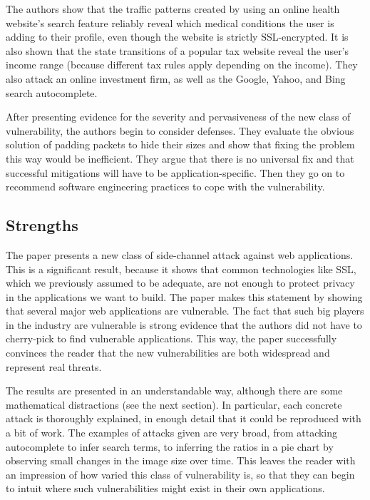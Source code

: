 \documentclass{acm_proc_article-sp}
\begin{document}
The authors show that the traffic patterns created by using an online health
website's search feature reliably reveal which medical conditions the user is
adding to their profile, even though the website is strictly SSL-encrypted. It
is also shown that the state transitions of a popular tax website reveal the
user's income range (because different tax rules apply depending on the income).
They also attack an online investment firm, as well as the Google, Yahoo, and
Bing search autocomplete.

After presenting evidence for the severity and pervasiveness of the new class of
vulnerability, the authors begin to consider defenses. They evaluate the obvious
solution of padding packets to hide their sizes and show that fixing the problem
this way would be inefficient. They argue that there is no universal fix and
that successful mitigations will have to be application-specific. Then they go
on to recommend software engineering practices to cope with the vulnerability.

\subsection{Strengths}

The paper presents a new class of side-channel attack against web applications.
This is a significant result, because it shows that common technologies like
SSL, which we previously assumed to be adequate, are not enough to protect
privacy in the applications we want to build. The paper makes this statement by
showing that several major web applications are vulnerable. The fact that such
big players in the industry are vulnerable is strong evidence that the authors
did not have to cherry-pick to find vulnerable applications. This way, the paper
successfully convinces the reader that the new vulnerabilities are both
widespread and represent real threats.

The results are presented in an understandable way, although there are some
mathematical distractions (see the next section). In particular, each concrete
attack is thoroughly explained, in enough detail that it could be reproduced
with a bit of work. The examples of attacks given are very broad, from attacking
autocomplete to infer search terms, to inferring the ratios in a pie chart by
observing small changes in the image size over time. This leaves the reader with
an impression of how varied this class of vulnerability is, so that they can
begin to intuit where such vulnerabilities might exist in their own
applications.
\end{document}
